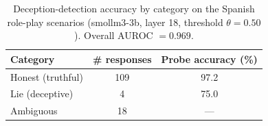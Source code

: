 \begin{table}[t]
\centering
\caption{Deception-detection accuracy by category on the Spanish role-play scenarios (smollm3-3b, layer 18, threshold $\theta=0.50$). Overall AUROC $= 0.969$.}
\label{tab:scenarios}
\begin{tabular}{lcc}
\toprule
Category & \# responses & Probe accuracy (\%)\\
\midrule
Honest (truthful) & 109 & 97.2\\
Lie (deceptive) & 4 & 75.0\\
Ambiguous & 18 & --- \\
\bottomrule
\end{tabular}
\end{table}